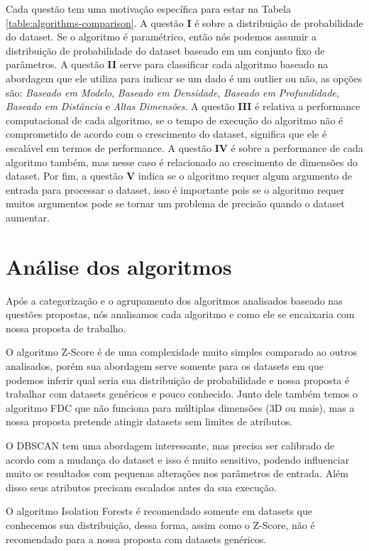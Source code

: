 Cada questão tem uma motivação específica para estar na Tabela \ref{table:algorithms-comparison}. A questão \textbf{I} é sobre a distribuição de probabilidade do dataset. Se o algoritmo é paramétrico, então nós podemos assumir a distribuição de probabilidade do dataset baseado em um conjunto fixo de parâmetros. A questão \textbf{II} serve para classificar cada algoritmo baseado na abordagem que ele utiliza para indicar se um dado é um outlier ou não, as opções são: \textit{Baseado em Modelo}, \textit{Baseado em Densidade}, \textit{Baseado em Profundidade}, \textit{Baseado em Distância} e \textit{Altas Dimensões}. A questão \textbf{III} é relativa a performance computacional de cada algoritmo, se o tempo de execução do algoritmo não é comprometido de acordo com o crescimento do dataset, significa que ele é escalável em termos de performance. A questão \textbf{IV} é sobre a performance de cada algoritmo também, mas nesse caso é relacionado ao crescimento de dimensões do dataset. Por fim, a questão \textbf{V} indica se o algoritmo requer algum argumento de entrada para processar o dataset, isso é importante pois se o algoritmo requer muitos argumentos pode se tornar um problema de precisão quando o dataset aumentar.

\section{Análise dos algoritmos}

Após a categorização e o agrupamento dos algoritmos analisados baseado nas questões propostas, nós analisamos cada algoritmo e como ele se encaixaria com nossa proposta de trabalho.

O algoritmo Z-Score é de uma complexidade muito simples comparado ao outros analisados, porém sua abordagem serve somente para os datasets em que podemos inferir qual seria sua distribuição de probabilidade e nossa proposta é trabalhar com datasets genéricos e pouco conhecido. Junto dele também temos o algoritmo FDC que não funciona para múltiplas dimensões (3D ou mais), mas a nossa proposta pretende atingir datasets sem limites de atributos.

O DBSCAN tem uma abordagem interessante, mas precisa ser calibrado de acordo com a mudança do dataset e isso é muito sensitivo, podendo influenciar muito os resultados com pequenas alterações nos parâmetros de entrada. Além disso seus atributos precisam escalados antes da sua execução.

O algoritmo Isolation Forests é recomendado somente em datasets que conhecemos sua distribuição, dessa forma, assim como o Z-Score, não é recomendado para a nossa proposta com datasets genéricos.

